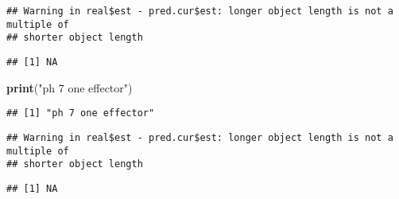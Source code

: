 \documentclass[
]{article}
\newenvironment{Shaded}{\begin{snugshade}}{\end{snugshade}}
\newcommand{\DecValTok}[1]{\textcolor[rgb]{0.00,0.00,0.81}{#1}}
\newcommand{\FunctionTok}[1]{\textcolor[rgb]{0.13,0.29,0.53}{\textbf{#1}}}
\newcommand{\NormalTok}[1]{#1}
\newcommand{\OtherTok}[1]{\textcolor[rgb]{0.56,0.35,0.01}{#1}}
\newcommand{\SpecialCharTok}[1]{\textcolor[rgb]{0.81,0.36,0.00}{\textbf{#1}}}
\newcommand{\StringTok}[1]{\textcolor[rgb]{0.31,0.60,0.02}{#1}}
\begin{document}
\begin{Shaded}
\end{Shaded}

\begin{verbatim}
## Warning in real$est - pred.cur$est: longer object length is not a multiple of
## shorter object length
\end{verbatim}

\begin{verbatim}
## [1] NA
\end{verbatim}

\begin{Shaded}
\begin{Highlighting}[]
\FunctionTok{print}\NormalTok{(}\StringTok{"ph 7 one effector"}\NormalTok{)}
\end{Highlighting}
\end{Shaded}

\begin{verbatim}
## [1] "ph 7 one effector"
\end{verbatim}

\begin{Shaded}
\end{Shaded}

\begin{verbatim}
## Warning in real$est - pred.cur$est: longer object length is not a multiple of
## shorter object length
\end{verbatim}

\begin{verbatim}
## [1] NA
\end{verbatim}
\end{document}
